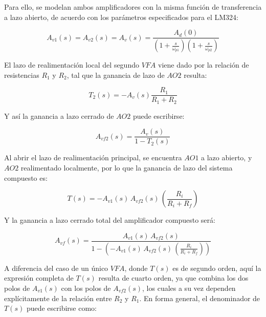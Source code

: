 \documentclass[12pt,a4paper]{article}
\begin{document}
Para ello, se modelan ambos amplificadores con la misma función de transferencia a lazo abierto, de acuerdo con los parámetros especificados para el LM324:

   \begin{equation}
        \label{eq_46}
A_{v1}(s) = A_{v2}(s) = A_v(s) = \frac{A_d(0)}{\left(1+\frac{s}{\omega_{p1}}\right)\left(1+\frac{s}{\omega_{p2}}\right)}
\end{equation}
    \hspace{0.5 cm}

El lazo de realimentación local del segundo $VFA$ viene dado por la relación de resistencias $R_1$ y $R_2$, tal que la ganancia de lazo de $AO2$ resulta:

   \begin{equation}
        \label{eq_47}
T_2(s) = -A_v(s)\frac{R_1}{R_1 + R_2}
\end{equation}
    \hspace{0.5 cm}

Y así la ganancia a lazo cerrado de $AO2$ puede escribirse:
    
   \begin{equation}
        \label{eq_48}
A_{vf2}(s) = \frac{A_v(s)}{1-T_2(s)}
\end{equation}
    \hspace{0.5 cm}

Al abrir el lazo de realimentación principal, se encuentra $AO1$ a lazo abierto, y $AO2$ realimentado localmente, por lo que la ganancia de lazo del sistema compuesto es:

   \begin{equation}
        \label{eq_49}
T(s) = -A_{v1}(s)\,A_{vf2}(s)\,\left(\frac{R_i}{R_i + R_f}\right)
\end{equation}
    \hspace{0.5 cm}

Y la ganancia a lazo cerrado total del amplificador compuesto será:

   \begin{equation}
        \label{eq_50}
A_{vf}(s) = \frac{A_{v1}(s)\,A_{vf2}(s)}{1-\left(-A_{v1}(s)\,A_{vf2}(s)\,\left(\frac{R_i}{R_i + R_f}\right)\right)}
\end{equation}
    \hspace{0.5 cm}


A diferencia del caso de un único $VFA$, donde $T(s)$ es de segundo orden, aquí la expresión completa de $T(s)$ resulta de cuarto orden, ya que combina los dos polos de $A_{v1}(s)$ con los polos de $A_{vf2}(s)$, los cuales a su vez dependen explícitamente de la relación entre $R_2$ y $R_1$. En forma general, el denominador de $T(s)$ puede escribirse como:
\end{document}
